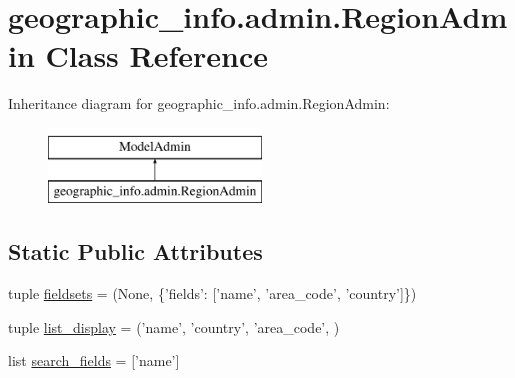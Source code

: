 \hypertarget{classgeographic__info_1_1admin_1_1_region_admin}{\section{geographic\-\_\-info.\-admin.\-Region\-Admin Class Reference}
\label{classgeographic__info_1_1admin_1_1_region_admin}
}
Inheritance diagram for geographic\-\_\-info.\-admin.\-Region\-Admin\-:\begin{figure}[H]
\begin{center}
\leavevmode
\includegraphics[height=2.000000cm]{classgeographic__info_1_1admin_1_1_region_admin}
\end{center}
\end{figure}
\subsection*{Static Public Attributes}
\begin{DoxyCompactItemize}
\item 
tuple \hyperlink{classgeographic__info_1_1admin_1_1_region_admin_ad60e4aec8409f4aaa41f6219d7ea7c60}{fieldsets} = (None, \{'fields'\-: \mbox{[}'name', 'area\-\_\-code', 'country'\mbox{]}\})
\item 
tuple \hyperlink{classgeographic__info_1_1admin_1_1_region_admin_a4a7f66500a9d73a6632fc584b1a07467}{list\-\_\-display} = ('name', 'country', 'area\-\_\-code', )
\item 
list \hyperlink{classgeographic__info_1_1admin_1_1_region_admin_aa6267eb8eefb5d29336e4664cb45f455}{search\-\_\-fields} = \mbox{[}'name'\mbox{]}
\end{DoxyCompactItemize}


